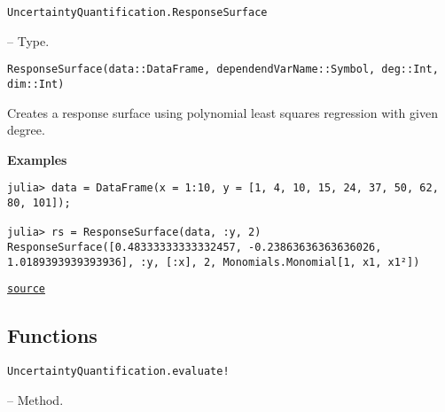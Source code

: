 \label{5754456517017253880}{}

\hypertarget{1355353364404016589}{\texttt{UncertaintyQuantification.ResponseSurface}}  -- {Type.}

\begin{adjustwidth}{2em}{0pt}


\begin{verbatim}
ResponseSurface(data::DataFrame, dependendVarName::Symbol, deg::Int, dim::Int)
\end{verbatim}

Creates a response surface using polynomial least squares regression with given degree.

\textbf{Examples}


\begin{verbatim}
julia> data = DataFrame(x = 1:10, y = [1, 4, 10, 15, 24, 37, 50, 62, 80, 101]);

julia> rs = ResponseSurface(data, :y, 2)
ResponseSurface([0.48333333333332457, -0.23863636363636026, 1.0189393939393936], :y, [:x], 2, Monomials.Monomial[1, x1, x1²])
\end{verbatim}



\href{https://github.com/friesischscott/UncertaintyQuantification.jl/blob/f5ee6cce729f0d6a57979257379c942cdf42f86f/src/models/responsesurface.jl#L1-L13}{\texttt{source}}


\end{adjustwidth}

\subsection{Functions}



\label{13536066633202303496}{}

\hypertarget{10749969932520960523}{\texttt{UncertaintyQuantification.evaluate!}}  -- {Method.}

